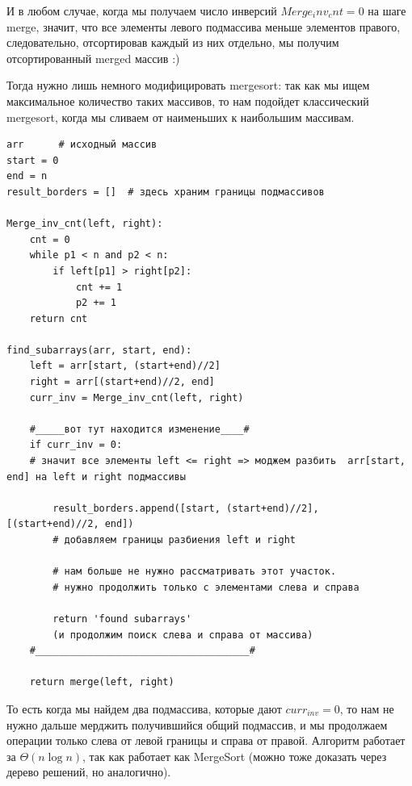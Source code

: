 \documentclass{article}
\begin{document}
И в любом случае, когда мы получаем число инверсий $Merge_inv_cnt = 0$ на шаге merge, значит, что все элементы левого подмассива меньше элементов правого, следовательно, отсортировав каждый из них отдельно, мы получим отсортированный merged массив :)

Тогда нужно лишь немного модифицировать mergesort: так как мы ищем максимальное количество таких массивов, то нам подойдет классический mergesort, когда мы сливаем от наименьших к наибольшим массивам.

\begin{verbatim}
arr      # исходный массив
start = 0
end = n
result_borders = []  # здесь храним границы подмассивов

Merge_inv_cnt(left, right):
    cnt = 0
    while p1 < n and p2 < n:
        if left[p1] > right[p2]:
            cnt += 1
            p2 += 1
    return cnt

find_subarrays(arr, start, end):
    left = arr[start, (start+end)//2]
    right = arr[(start+end)//2, end]
    curr_inv = Merge_inv_cnt(left, right)

    #_____вот тут находится изменение____#
    if curr_inv = 0:        
    # значит все элементы left <= right => моджем разбить  arr[start, end] на left и right подмассивы
    
        result_borders.append([start, (start+end)//2], [(start+end)//2, end])
        # добавляем границы разбиения left и right

        # нам больше не нужно рассматривать этот участок. 
        # нужно продолжить только с элементами слева и справа

        return 'found subarrays'
        (и продолжим поиск слева и справа от массива)
    #_____________________________________#
    
    return merge(left, right)
\end{verbatim}

То есть когда мы найдем два подмассива, которые дают $curr_{inv} = 0$, то нам не нужно дальше мерджить получившийся общий подмассив, и мы продолжаем операции только слева от левой границы и справа от правой. Алгоритм работает за $\Theta(n\log n)$, так как работает как MergeSort (можно тоже доказать через дерево решений, но аналогично). 
\end{document}
